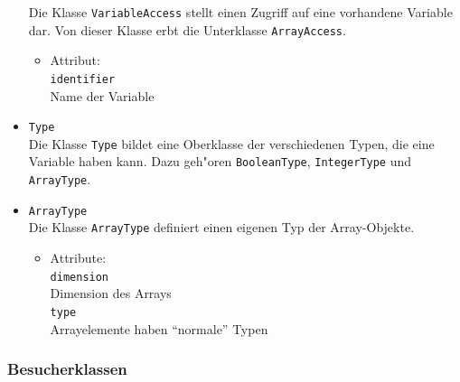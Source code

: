 \documentclass[10pt,a4paper,titlepage]{article}
\begin{document}
\begin{itemize}
Die Klasse \texttt{VariableAccess} stellt einen Zugriff auf eine vorhandene Variable dar. Von dieser Klasse erbt die Unterklasse \texttt{ArrayAccess}. 
\begin{itemize}
\item Attribut: \\
\texttt{identifier} \\
Name der Variable 
\end{itemize}
\item \texttt{Type} \\
Die Klasse \texttt{Type} bildet eine Oberklasse der verschiedenen Typen, die eine Variable haben kann. Dazu geh"oren \texttt{BooleanType}, \texttt{IntegerType} und \texttt{ArrayType}.
\item \texttt{ArrayType} \\
Die Klasse \texttt{ArrayType} definiert einen eigenen Typ der Array-Objekte. 
\begin{itemize}
\item Attribute: \\
\texttt{dimension} \\
Dimension des Arrays \\
\texttt{type} \\
Arrayelemente haben "`normale"' Typen \\
\end{itemize}
\end{itemize}

\subsubsection{Besucherklassen}
\end{document}
